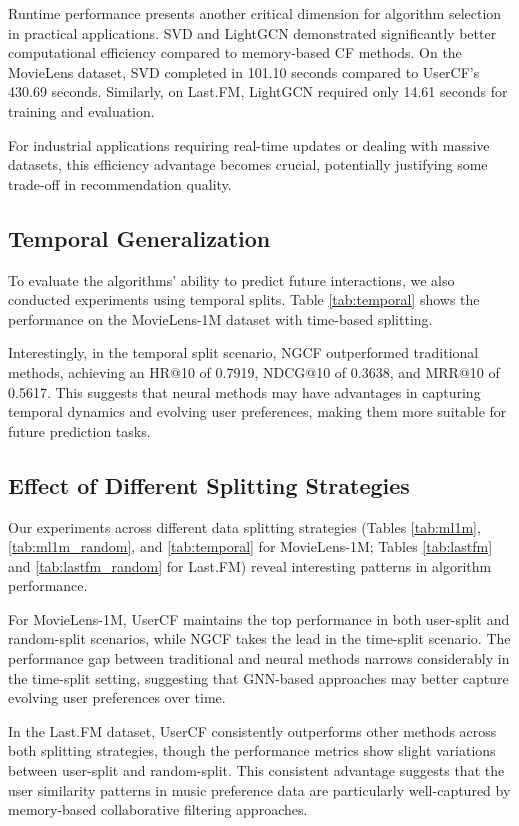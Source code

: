 \documentclass[sigconf,nonacm]{acmart} %
\begin{document}
Runtime performance presents another critical dimension for algorithm selection in practical applications. SVD and LightGCN demonstrated significantly better computational efficiency compared to memory-based CF methods. On the MovieLens dataset, SVD completed in 101.10 seconds compared to UserCF's 430.69 seconds. Similarly, on Last.FM, LightGCN required only 14.61 seconds for training and evaluation.  

For industrial applications requiring real-time updates or dealing with massive datasets, this efficiency advantage becomes crucial, potentially justifying some trade-off in recommendation quality.  

\subsection{Temporal Generalization}  

To evaluate the algorithms' ability to predict future interactions, we also conducted experiments using temporal splits. Table \ref{tab:temporal} shows the performance on the MovieLens-1M dataset with time-based splitting.  

Interestingly, in the temporal split scenario, NGCF outperformed traditional methods, achieving an HR@10 of 0.7919, NDCG@10 of 0.3638, and MRR@10 of 0.5617. This suggests that neural methods may have advantages in capturing temporal dynamics and evolving user preferences, making them more suitable for future prediction tasks.  

\subsection{Effect of Different Splitting Strategies}  

Our experiments across different data splitting strategies (Tables \ref{tab:ml1m}, \ref{tab:ml1m_random}, and \ref{tab:temporal} for MovieLens-1M; Tables \ref{tab:lastfm} and \ref{tab:lastfm_random} for Last.FM) reveal interesting patterns in algorithm performance.   

For MovieLens-1M, UserCF maintains the top performance in both user-split and random-split scenarios, while NGCF takes the lead in the time-split scenario. The performance gap between traditional and neural methods narrows considerably in the time-split setting, suggesting that GNN-based approaches may better capture evolving user preferences over time.  

In the Last.FM dataset, UserCF consistently outperforms other methods across both splitting strategies, though the performance metrics show slight variations between user-split and random-split. This consistent advantage suggests that the user similarity patterns in music preference data are particularly well-captured by memory-based collaborative filtering approaches.  
\end{document}

